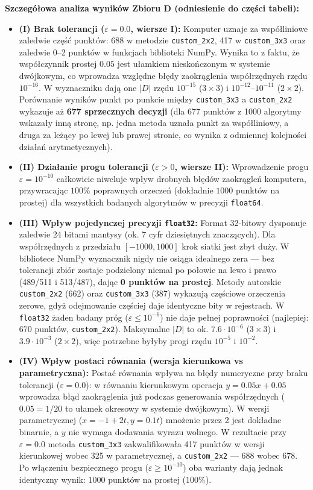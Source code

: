 \documentclass[10pt,a4paper]{article}
\begin{document}
\textbf{Szczegółowa analiza wyników Zbioru D (odniesienie do części tabeli):}
\begin{itemize}
    \item \textbf{(I) Brak tolerancji ($\varepsilon = 0.0$, wiersze I):} Komputer uznaje za współliniowe zaledwie część punktów: 688 w metodzie \texttt{custom\_2x2}, 417 w \texttt{custom\_3x3} oraz zaledwie 0--2 punktów w funkcjach biblioteki NumPy. Wynika to z faktu, że współczynnik prostej $0.05$ jest ułamkiem nieskończonym w systemie dwójkowym, co wprowadza względne błędy zaokrąglenia współrzędnych rzędu $10^{-16}$. W wyznaczniku dają one $|D|$ rzędu $10^{-15}$ ($3 \times 3$) i $10^{-12}$--$10^{-11}$ ($2 \times 2$). Porównanie wyników punkt po punkcie między \texttt{custom\_3x3} a \texttt{custom\_2x2} wykazuje aż \textbf{677 sprzecznych decyzji} (dla 677 punktów z 1000 algorytmy wskazały inną stronę, np. jedna metoda uznała punkt za współliniowy, a druga za leżący po lewej lub prawej stronie, co wynika z odmiennej kolejności działań arytmetycznych).
    \item \textbf{(II) Działanie progu tolerancji ($\varepsilon > 0$, wiersze II):} Wprowadzenie progu $\varepsilon = 10^{-10}$ całkowicie niweluje wpływ drobnych błędów zaokrągleń komputera, przywracając $100\%$ poprawnych orzeczeń (dokładnie $1000$ punktów na prostej) dla wszystkich badanych algorytmów w precyzji \texttt{float64}.
    \item \textbf{(III) Wpływ pojedynczej precyzji \texttt{float32}:} Format 32-bitowy dysponuje zaledwie 24 bitami mantysy (ok. 7 cyfr dziesiętnych znaczących). Dla współrzędnych z przedziału $[-1000, 1000]$ krok siatki jest zbyt duży. W bibliotece NumPy wyznacznik nigdy nie osiąga idealnego zera --- bez tolerancji zbiór zostaje podzielony niemal po połowie na lewo i prawo (489/511 i 513/487), dając \textbf{0 punktów na prostej}. Metody autorskie \texttt{custom\_2x2} (662) oraz \texttt{custom\_3x3} (387) wykazują częściowe orzeczenia zerowe, gdyż odejmowanie częściej daje identyczne bity w rejestrach. W \texttt{float32} żaden badany próg ($\varepsilon \le 10^{-6}$) nie daje pełnej poprawności (najlepiej: 670 punktów, \texttt{custom\_2x2}). Maksymalne $|D|$ to ok. $7.6 \cdot 10^{-6}$ ($3 \times 3$) i $3.9 \cdot 10^{-3}$ ($2 \times 2$), więc potrzebne byłyby progi rzędu $10^{-5}$ i $10^{-2}$.
    \item \textbf{(IV) Wpływ postaci równania (wersja kierunkowa vs parametryczna):} Postać równania wpływa na błędy numeryczne przy braku tolerancji ($\varepsilon = 0.0$): w równaniu kierunkowym operacja $y = 0.05x + 0.05$ wprowadza błąd zaokrąglenia już podczas generowania współrzędnych ($0.05 = 1/20$ to ułamek okresowy w systemie dwójkowym). W wersji parametrycznej ($x = -1 + 2t, y = 0.1t$) mnożenie przez 2 jest dokładne binarnie, a $y$ nie wymaga dodawania wyrazu wolnego. W rezultacie przy $\varepsilon = 0.0$ metoda \texttt{custom\_3x3} zakwalifikowała 417 punktów w wersji kierunkowej wobec 325 w parametrycznej, a \texttt{custom\_2x2} --- 688 wobec 678. Po włączeniu bezpiecznego progu ($\varepsilon \ge 10^{-10}$) oba warianty dają jednak identyczny wynik: $1000$ punktów na prostej ($100\%$).
\end{itemize}
\end{document}
